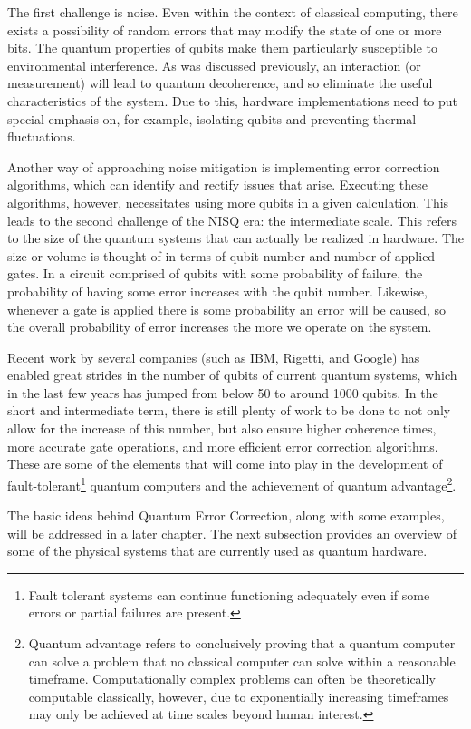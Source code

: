 The first challenge is noise. Even within the context of classical computing, there exists a possibility of random errors that may modify the state of one or more bits. The quantum properties of qubits make them particularly susceptible to environmental interference. As was discussed previously, an interaction (or measurement) will lead to quantum decoherence, and so eliminate the useful characteristics of the system. Due to this, hardware implementations need to put special emphasis on, for example, isolating qubits and preventing thermal fluctuations. 

Another way of approaching noise mitigation is implementing error correction algorithms, which can identify and rectify issues that arise. Executing these algorithms, however, necessitates using more qubits in a given calculation. This leads to the second challenge of the NISQ era: the intermediate scale. This refers to the size of the quantum systems that can actually be realized in hardware. The size or volume is thought of in terms of qubit number and number of applied gates. In a circuit comprised of qubits with some probability of failure, the probability of having some error increases with the qubit number. Likewise, whenever a gate is applied there is some probability an error will be caused, so the overall probability of error increases the more we operate on the system.

Recent work by several companies (such as IBM, Rigetti, and Google) has enabled great strides in the number of qubits of current quantum systems, which in the last few years has jumped from below 50 to around 1000 qubits. In the short and intermediate term, there is still plenty of work to be done to not only allow for the increase of this number, but also ensure higher coherence times, more accurate gate operations, and more efficient error correction algorithms. These are some of the elements that will come into play in the development of fault-tolerant\footnote{Fault tolerant systems can continue functioning adequately even if some errors or partial failures are present.} quantum computers and the achievement of quantum advantage\footnote{Quantum advantage refers to conclusively proving that a quantum computer can solve a problem that no classical computer can solve within a reasonable timeframe. Computationally complex problems can often be theoretically computable classically, however, due to exponentially increasing timeframes may only be achieved at time scales beyond human interest.}.

The basic ideas behind Quantum Error Correction, along with some examples, will be addressed in a later chapter. The next subsection provides an overview of some of the physical systems that are currently used as quantum hardware.

